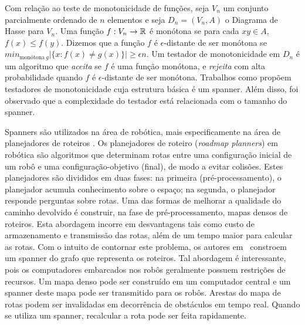 Com relação ao teste de monotonicidade de funções, 
seja $V_n$ um
conjunto parcialmente ordenado
de $n$ elementos e seja $D_n = (V_n, A)$ o Diagrama de Hasse para $V_n$. Uma função $f: V_n \rightarrow \mathbb{R}$ é monótona se para cada $xy \in A$, $f(x) \le f(y)$. Dizemos que a função $f$ é $\epsilon$-distante de ser monótona se $min_{\text{monótona}\ g}|\{ x: f(x) \neq g(x) \}| \ge \epsilon n$.  Um testador de monotonicidade em $D_n$ é um algoritmo que \emph{aceita} se $f$  é uma função monótona, e \emph{rejeita} com alta probabilidade quando  $f$ é $\epsilon$-distante de ser monótona. 
Trabalhos como \cite{BhattacharyyaGJRW2009,BhattacharyyaGJJRW2010,BermanBMRY2011} 
  propõem testadores de monotonicidade cuja estrutura básica
é um spanner. Além disso, foi observado que a complexidade do testador
está relacionada com o tamanho do spanner.

Spanners são utilizados na área de robótica, mais especificamente na área de planejadores de roteiros \cite{MarbleB2011,MarbleB2011b,MarbleB2012,MarbleB2013,WangBC2015}.  Os planejadores de roteiro (\emph{roadmap planners}) em robótica são algoritmos que determinam rotas entre uma configuração inicial de um robô e uma configuração-objetivo (final), de modo a evitar colisões.  Estes planejadores são divididos em duas fases: na primeira (pré-processamento), o planejador acumula conhecimento sobre o espaço; na segunda, o planejador responde perguntas sobre rotas.  Uma das formas de melhorar a qualidade do caminho devolvido é construir, na fase de pré-processamento, mapas densos de roteiros. Esta abordagem incorre em desvantagens tais como custo de armazenamento e transmissão das rotas, além de um tempo maior para calcular as rotas.  Com o intuito de contornar este problema, os autores em~\cite{MarbleB2011} constroem um spanner do grafo que representa
os roteiros. Tal abordagem é interessante, pois os computadores embarcados
nos robôs geralmente possuem restrições de recursos. Um mapa denso pode
ser construído em um computador central e um spanner deste mapa pode ser
transmitido para os robôs. Arestas do mapa de rotas podem ser invalidadas
em decorrência de obstáculos em tempo real. Quando se utiliza um spanner,
recalcular a rota pode ser feita rapidamente.

